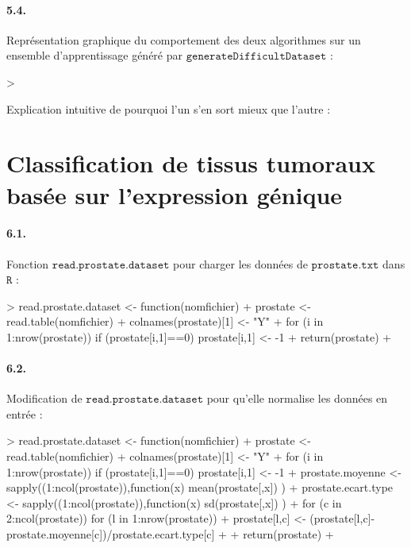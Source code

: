 \documentclass{article}
\begin{document}
\paragraph{5.4.}Représentation graphique du comportement des deux 
algorithmes sur un ensemble d'apprentissage généré par 
$\mathtt{generateDifficultDataset}$ :
\begin{Schunk}
\begin{Sinput}
> 
\end{Sinput}
\end{Schunk}
Explication intuitive de pourquoi l'un s'en sort mieux que l'autre :\\

\newpage
\section{Classification de tissus tumoraux basée sur l'expression génique}
\paragraph{6.1.}Fonction $\mathtt{read.prostate.dataset}$ pour charger 
les données de $\mathtt{prostate.txt}$ dans $\mathtt{R}$ :
\begin{Schunk}
\begin{Sinput}
> read.prostate.dataset <- function(nomfichier) {
+ 	prostate <- read.table(nomfichier)
+ 	colnames(prostate)[1] <- "Y"
+ 	for (i in 1:nrow(prostate)) {if (prostate[i,1]==0) {prostate[i,1] <- -1} }
+ 	return(prostate)
+ }
\end{Sinput}
\end{Schunk}
\paragraph{6.2.}Modification de $\mathtt{read.prostate.dataset}$ pour 
qu'elle normalise les données en entrée :
\begin{Schunk}
\begin{Sinput}
> read.prostate.dataset <- function(nomfichier) {
+ 	prostate <- read.table(nomfichier)
+ 	colnames(prostate)[1] <- "Y"
+ 	for (i in 1:nrow(prostate)) {if (prostate[i,1]==0) {prostate[i,1] <- -1} }
+ 	prostate.moyenne <- sapply((1:ncol(prostate)),function(x) mean(prostate[,x]) )
+ 	prostate.ecart.type <- sapply((1:ncol(prostate)),function(x) sd(prostate[,x]) )
+ 	for (c in 2:ncol(prostate)) {for (l in 1:nrow(prostate)) {
+ 		prostate[l,c] <- (prostate[l,c]-prostate.moyenne[c])/prostate.ecart.type[c]}
+ 	}
+ 	return(prostate)
+ }
\end{Sinput}
\end{Schunk}
\end{document}

